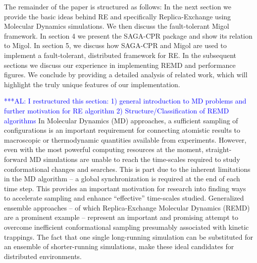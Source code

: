 \documentclass[conference,final]{IEEEtran}
\newcommand{\up}{\vspace*{-1em}}
\newcommand{\alnote}[1]{ {\textcolor{blue} { ***AL: #1 }}}
\newcommand{\jhanote}[1]{ {\textcolor{red} { ***SJ: #1 }}}
\newcommand{\alnote}[1]{}
\newcommand{\jhanote}[1]{}
\begin{document}

The remainder of the paper is structured as follows: In the next
section we provide the basic ideas behind RE and specifically
Replica-Exchange using Molecular Dynamics simulations.  We then
discuss the fault-tolerant Migol framework. In section 4 we present
the SAGA-CPR package and show its relation to Migol. In section 5, we
discuss how SAGA-CPR and Migol are used to implement a fault-tolerant,
distributed framework for RE.  In the subsequent sections we discuss
our experience in implementing REMD and performance figures. We
conclude by providing a detailed analysis of related work, which will
highlight the truly unique features of our implementation.


\up
{}
\alnote{I restructured this section: 1) general introduction to MD
  problems and further motivation for RE algorithm 2)
  Structure/Classification of REMD algorithms} 
\up In Molecular
Dynamics (MD) approaches, a sufficient sampling of configurations is
an important requirement for connecting atomistic results to
macroscopic or thermodynamic quantities available from experiments.
However, even with the most powerful computing resources at the
moment, straight-forward MD simulations are unable to reach the
time-scales required to study conformational changes and
searches. This is part due to the inherent limitations in the MD
algorithm -- a global synchronization is required at the end of each
time step.  This provides an important motivation for research into
finding ways to accelerate sampling and enhance ``effective''
time-scales studied. Generalized ensemble approaches -- of which
Replica-Exchange Molecular Dynamics (REMD)~\cite{Sugita:1999rm} are a
prominent example -- represent an important and promising attempt to
overcome inefficient conformational sampling presumably associated
with kinetic trappings.  The fact that one single long-running
simulation can be substituted for an ensemble of shorter-running
simulations, make these ideal candidates for distributed environments.
\end{document}
